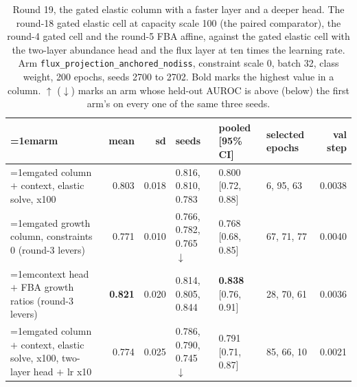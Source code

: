 \begin{table}[H]
  \centering
  \scriptsize
  \setlength{\tabcolsep}{2.5pt}
  \caption[Round 19, the gated elastic column with a faster layer and a deeper head]{Round 19, the gated elastic column with a faster layer and a deeper head. The round-18 gated elastic cell at capacity scale 100 (the paired comparator), the round-4 gated cell and the round-5 FBA affine, against the gated elastic cell with the two-layer abundance head and the flux layer at ten times the learning rate. Arm \texttt{flux\_projection\_anchored\_nodiss}, constraint scale 0, batch 32, class weight, 200 epochs, seeds 2700 to 2702. Bold marks the highest value in a column. $\uparrow$ ($\downarrow$) marks an arm whose held-out AUROC is above (below) the first arm's on every one of the same three seeds.}
  \label{tab:w35}
  \begin{tabular}{@{}>{\raggedright\hangindent=1em\hangafter=1\arraybackslash}p{81.1mm}rrlllr@{}}
    \hline
    arm & mean & sd & seeds & pooled [95\% CI] & selected epochs & val step \\
    \hline
    gated column $+$ context, elastic solve, x100 & 0.803 & 0.018 & 0.816, 0.810, 0.783 & 0.800 [0.72, 0.88] & 6, 95, 63 & 0.0038 \\
    gated growth column, constraints 0 (round-3 levers) & 0.771 & 0.010 & 0.766, 0.782, 0.765 $\downarrow$ & 0.768 [0.68, 0.85] & 67, 71, 77 & 0.0040 \\
    context head $+$ FBA growth ratios (round-3 levers) & \textbf{0.821} & 0.020 & 0.814, 0.805, 0.844 & \textbf{0.838} [0.76, 0.91] & 28, 70, 61 & 0.0036 \\
    gated column $+$ context, elastic solve, x100, two-layer head $+$ lr x10 & 0.774 & 0.025 & 0.786, 0.790, 0.745 $\downarrow$ & 0.791 [0.71, 0.87] & 85, 66, 10 & 0.0021 \\
    \hline
  \end{tabular}
\end{table}
